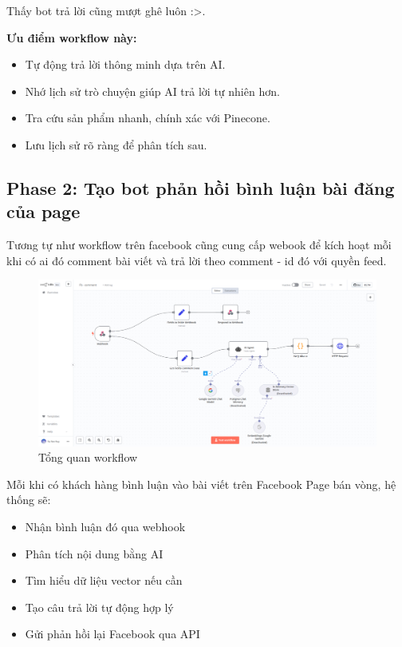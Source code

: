 Thấy bot trả lời cũng mượt ghê luôn :>.

\textbf{Ưu điểm workflow này:}

\begin{itemize}
    \item Tự động trả lời thông minh dựa trên AI.

    \item Nhớ lịch sử trò chuyện giúp AI trả lời tự nhiên hơn.

    \item Tra cứu sản phẩm nhanh, chính xác với Pinecone.

    \item Lưu lịch sử rõ ràng để phân tích sau.
\end{itemize}

\newpage
\subsection{Phase 2: Tạo bot phản hồi bình luận bài đăng của page}

Tương tự như workflow trên facebook cũng cung cấp webook để kích hoạt mỗi khi có ai đó comment bài viết và trả lời theo comment - id đó với quyền feed.

\begin{figure}[htbp]
    \centering
    \includegraphics[width=1\linewidth]{Chap1-7/fb-comment.pdf}
    \caption{Tổng quan workflow}
\end{figure}
Mỗi khi có khách hàng bình luận vào bài viết trên Facebook Page bán vòng, hệ thống sẽ:

\begin{itemize}
    \item Nhận bình luận đó qua webhook

    \item Phân tích nội dung bằng AI

    \item Tìm hiểu dữ liệu vector nếu cần

    \item Tạo câu trả lời tự động hợp lý

    \item Gửi phản hồi lại Facebook qua API
\end{itemize}

